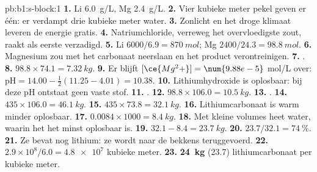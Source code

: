 \begin{solution}{pb:b1:s-block:1}
\textbf{1.} Li \qty{6.0}{g/L}, Mg \qty{2.4}{g/L}.
\textbf{2.} Vier kubieke meter pekel geven er één: er verdampt drie
kubieke meter water.
\textbf{3.} Zonlicht en het droge klimaat leveren de energie gratis.
\textbf{4.} Natriumchloride, verreweg het overvloedigste zout, raakt als
eerste verzadigd.
\textbf{5.} Li $6000/6.9 = \qty{870}{mol}$; Mg $2400/24.3 = \qty{98.8}{mol}$.
\textbf{6.} Magnesium zou met het carbonaat neerslaan en het product
verontreinigen.
\textbf{7.} .
\textbf{8.} $98.8 \times 74.1 = \qty{7.32}{kg}$.
\textbf{9.} Er blijft $[\ce{Mg^2+}] = \num{9.88e-5}$ mol/L over: $\mathrm{pH} = 14.00 -
\frac12(11.25 - 4.01) = 10.38$.
\textbf{10.} Lithiumhydroxide is oplosbaar: bij deze pH ontstaat geen
vaste stof.
\textbf{11.} .
\textbf{12.} $98.8 \times 106.0 = \qty{10.5}{kg}$.
\textbf{13.} .
\textbf{14.} $435 \times 106.0 = \qty{46.1}{kg}$.
\textbf{15.} $435 \times 73.8 = \qty{32.1}{kg}$.
\textbf{16.} Lithiumcarbonaat is warm minder oplosbaar.
\textbf{17.} $0.0084 \times 1000 = \qty{8.4}{kg}$.
\textbf{18.} Met kleine volumes heet water, waarin het het minst
oplosbaar is.
\textbf{19.} $32.1 - 8.4 = \qty{23.7}{kg}$.
\textbf{20.} $23.7/32.1 = \qty{74}{\percent}$.
\textbf{21.} Ze bevat nog lithium: ze wordt naar de bekkens teruggevoerd.
\textbf{22.} $2.9 \times 10^8/6.0 = \num{4.8e7}$ kubieke meter.
\textbf{23.} \textbf{\qty{24}{kg}} (23.7) lithiumcarbonaat per kubieke
meter.
\end{solution}
